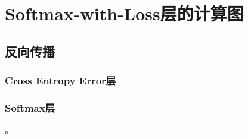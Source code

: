 \chapter{Softmax-with-Loss层的计算图\label{appendix}}
\section{反向传播}
\subsection{Cross Entropy Error层}
\subsection{Softmax层}
。